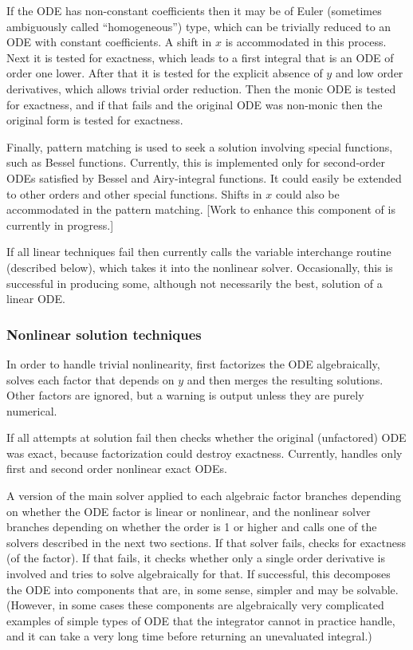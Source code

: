 If the ODE has non-constant coefficients then it may be of Euler
(sometimes ambiguously called ``homogeneous'') type, which can be
trivially reduced to an ODE with constant coefficients.  A shift in
$x$ is accommodated in this process.  Next it is tested for exactness,
which leads to a first integral that is an ODE of order one lower.
After that it is tested for the explicit absence of $y$ and low order
derivatives, which allows trivial order reduction.  Then the monic ODE
is tested for exactness, and if that fails and the original ODE was
non-monic then the original form is tested for exactness.

Finally, pattern matching is used to seek a solution involving special
functions, such as Bessel functions.  Currently, this is implemented
only for second-order ODEs satisfied by Bessel and Airy-integral
functions.  It could easily be extended to other orders and other
special functions.  Shifts in $x$ could also be accommodated in the
pattern matching.  [Work to enhance this component of  is
currently in progress.]

If all linear techniques fail then  currently calls the
variable interchange routine (described below), which takes it into
the nonlinear solver.  Occasionally, this is successful in producing
some, although not necessarily the best, solution of a linear ODE.


\subsubsection{Nonlinear solution techniques}

In order to handle trivial nonlinearity,  first
factorizes the ODE algebraically, solves each factor that depends on
$y$ and then merges the resulting solutions.  Other factors are
ignored, but a warning is output unless they are purely numerical.

If all attempts at solution fail then  checks whether the
original (unfactored) ODE was exact, because factorization could
destroy exactness.  Currently,  handles only first and
second order nonlinear exact ODEs.

A version of the main solver applied to each algebraic factor branches
depending on whether the ODE factor is linear or nonlinear, and the
nonlinear solver branches depending on whether the order is 1 or
higher and calls one of the solvers described in the next two
sections.  If that solver fails,  checks for exactness
(of the factor).  If that fails, it checks whether only a single order
derivative is involved and tries to solve algebraically for that.  If
successful, this decomposes the ODE into components that are, in some
sense, simpler and may be solvable.  (However, in some cases these
components are algebraically very complicated examples of simple types
of ODE that the integrator cannot in practice handle, and it can take
a very long time before returning an unevaluated integral.)

